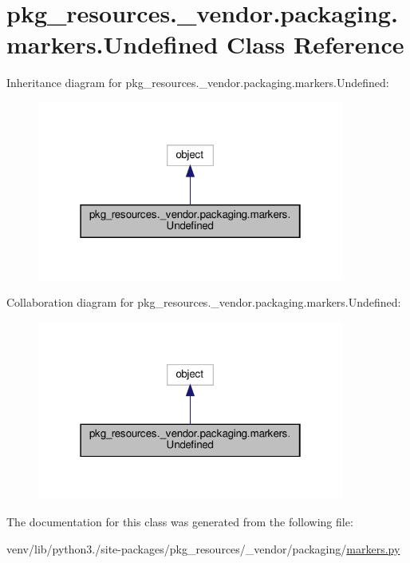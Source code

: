 \hypertarget{classpkg__resources_1_1__vendor_1_1packaging_1_1markers_1_1Undefined}{}\section{pkg\+\_\+resources.\+\_\+vendor.\+packaging.\+markers.\+Undefined Class Reference}
\label{classpkg__resources_1_1__vendor_1_1packaging_1_1markers_1_1Undefined}


Inheritance diagram for pkg\+\_\+resources.\+\_\+vendor.\+packaging.\+markers.\+Undefined\+:
\nopagebreak
\begin{figure}[H]
\begin{center}
\leavevmode
\includegraphics[width=286pt]{classpkg__resources_1_1__vendor_1_1packaging_1_1markers_1_1Undefined__inherit__graph}
\end{center}
\end{figure}


Collaboration diagram for pkg\+\_\+resources.\+\_\+vendor.\+packaging.\+markers.\+Undefined\+:
\nopagebreak
\begin{figure}[H]
\begin{center}
\leavevmode
\includegraphics[width=286pt]{classpkg__resources_1_1__vendor_1_1packaging_1_1markers_1_1Undefined__coll__graph}
\end{center}
\end{figure}


The documentation for this class was generated from the following file\+:\begin{DoxyCompactItemize}
\item 
venv/lib/python3./site-\/packages/pkg\+\_\+resources/\+\_\+vendor/packaging/\hyperlink{pkg__resources_2__vendor_2packaging_2markers_8py}{markers.\+py}\end{DoxyCompactItemize}
